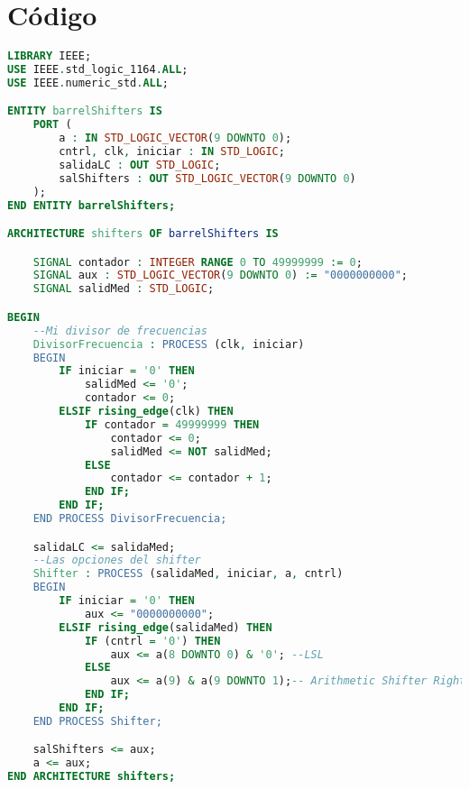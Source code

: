 \section{C\'odigo}
	\begin{lstlisting}[language={vhdl}, caption={Barrel Shifter (Prototipo)}, label={Script}]
LIBRARY IEEE;
USE IEEE.std_logic_1164.ALL;
USE IEEE.numeric_std.ALL;

ENTITY barrelShifters IS
    PORT (
        a : IN STD_LOGIC_VECTOR(9 DOWNTO 0);
        cntrl, clk, iniciar : IN STD_LOGIC;
        salidaLC : OUT STD_LOGIC;
        salShifters : OUT STD_LOGIC_VECTOR(9 DOWNTO 0)
    );
END ENTITY barrelShifters;

ARCHITECTURE shifters OF barrelShifters IS

    SIGNAL contador : INTEGER RANGE 0 TO 49999999 := 0;
    SIGNAL aux : STD_LOGIC_VECTOR(9 DOWNTO 0) := "0000000000";
    SIGNAL salidMed : STD_LOGIC;

BEGIN
    --Mi divisor de frecuencias
    DivisorFrecuencia : PROCESS (clk, iniciar)
    BEGIN
        IF iniciar = '0' THEN
            salidMed <= '0';
            contador <= 0;
        ELSIF rising_edge(clk) THEN
            IF contador = 49999999 THEN
                contador <= 0;
                salidMed <= NOT salidMed;
            ELSE
                contador <= contador + 1;
            END IF;
        END IF;
    END PROCESS DivisorFrecuencia;

    salidaLC <= salidaMed;
    --Las opciones del shifter
    Shifter : PROCESS (salidaMed, iniciar, a, cntrl)
    BEGIN
        IF iniciar = '0' THEN
            aux <= "0000000000";
        ELSIF rising_edge(salidaMed) THEN
            IF (cntrl = '0') THEN
                aux <= a(8 DOWNTO 0) & '0'; --LSL
            ELSE
                aux <= a(9) & a(9 DOWNTO 1);-- Arithmetic Shifter Right
            END IF;
        END IF;
    END PROCESS Shifter;

    salShifters <= aux;
    a <= aux;
END ARCHITECTURE shifters;
	\end{lstlisting}

